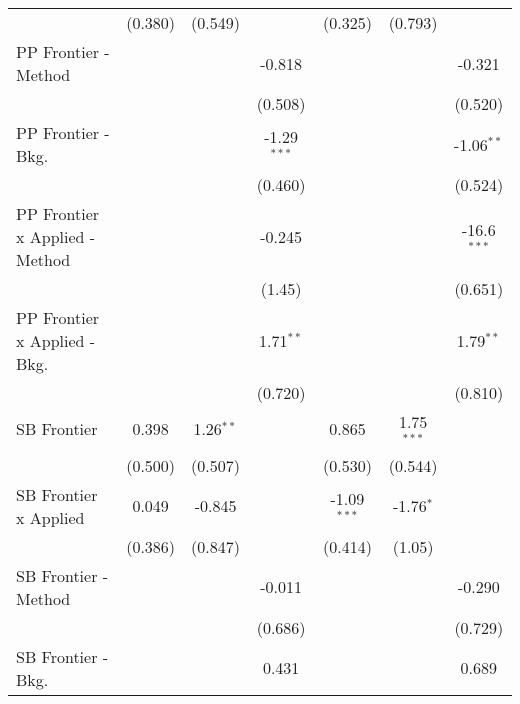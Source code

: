 \begin{tabular}{lcccccc}
                                  & (0.380)       & (0.549)        &               & (0.325)       & (0.793)       &   \\   
   PP Frontier - Method           &               &                & -0.818        &               &               & -0.321\\   
                                  &               &                & (0.508)       &               &               & (0.520)\\   
   PP Frontier - Bkg.             &               &                & -1.29$^{***}$ &               &               & -1.06$^{**}$\\   
                                  &               &                & (0.460)       &               &               & (0.524)\\   
   PP Frontier x Applied - Method &               &                & -0.245        &               &               & -16.6$^{***}$\\   
                                  &               &                & (1.45)        &               &               & (0.651)\\   
   PP Frontier x Applied - Bkg.   &               &                & 1.71$^{**}$   &               &               & 1.79$^{**}$\\   
                                  &               &                & (0.720)       &               &               & (0.810)\\   
   SB Frontier                    & 0.398         & 1.26$^{**}$    &               & 0.865         & 1.75$^{***}$  &   \\   
                                  & (0.500)       & (0.507)        &               & (0.530)       & (0.544)       &   \\   
   SB Frontier x Applied          & 0.049         & -0.845         &               & -1.09$^{***}$ & -1.76$^{*}$   &   \\   
                                  & (0.386)       & (0.847)        &               & (0.414)       & (1.05)        &   \\   
   SB Frontier - Method           &               &                & -0.011        &               &               & -0.290\\   
                                  &               &                & (0.686)       &               &               & (0.729)\\   
   SB Frontier - Bkg.             &               &                & 0.431         &               &               & 0.689\\   

\end{tabular}
